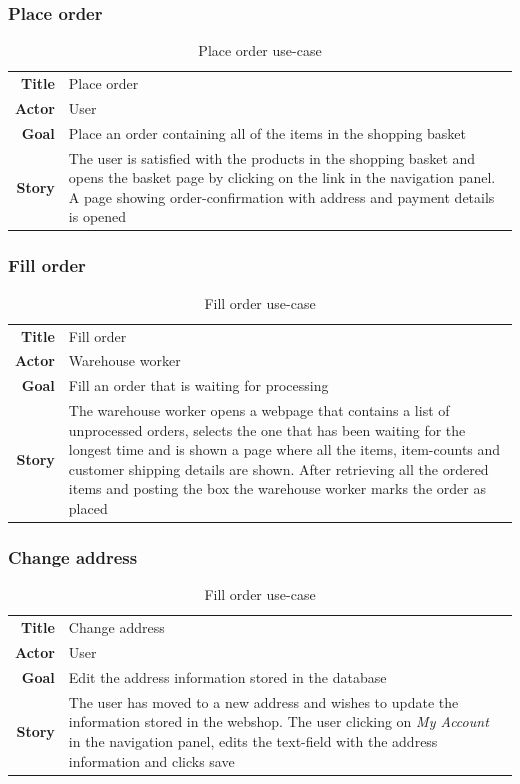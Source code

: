 \documentclass[12pt, a4paper,titlepage]{article}
\begin{document}
\subsubsection{Place order}
\begin{table}[H]
\centering
\begin{tabular}{r | p{12cm}}
\textbf{Title} & Place order \\
\textbf{Actor} & User \\
\textbf{Goal} & Place an order containing all of the items in the shopping basket \\
\textbf{Story} & The user is satisfied with the products in the shopping basket and opens the basket page by clicking on the link in the navigation panel.
A page showing order-confirmation with address and payment details is opened \\
\end{tabular}
\caption{Place order use-case}
\end{table}

\subsubsection{Fill order}
\begin{table}[H]
\centering
\begin{tabular}{r | p{12cm}}
\textbf{Title} & Fill order \\
\textbf{Actor} & Warehouse worker \\
\textbf{Goal} & Fill an order that is waiting for processing \\
\textbf{Story} & The warehouse worker opens a webpage that contains a list of
unprocessed orders, selects the one that has been waiting for the longest time and is shown a page where all the items, item-counts and customer shipping
details are shown. 
After retrieving all the ordered items and posting the box  the warehouse worker marks the order as placed\\
\end{tabular}
\caption{Fill order use-case}
\end{table}

\subsubsection{Change address}
\begin{table}[H]
\centering
\begin{tabular}{r | p{12cm}}
\textbf{Title} & Change address \\
\textbf{Actor} & User \\
\textbf{Goal} & Edit the address information stored in the database \\
\textbf{Story} & The user has moved to a new address and wishes to update
the information stored in the webshop. The user clicking on \emph{My Account}
in the navigation panel, edits the text-field with the address information and
clicks save \\
\end{tabular}
\caption{Fill order use-case}
\end{table}
\end{document}
